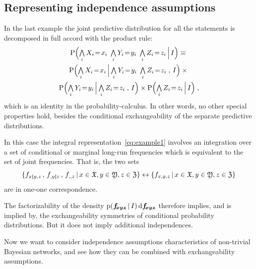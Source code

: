 \documentclass[\ifafour a4paper,12pt,\else a5paper,10pt,\fi%
onecolumn,oneside,article,%
british%
]{memoir}
\theoremstyle{remark}
\theoremstyle{innote}
\newcommand*{\di}{\mathrm{d}}%
\newcommand*{\Land}{\mathop{\textstyle\bigwedge}}
\DeclarePairedDelimiter\set{\{}{\}}
\newcommand*{\pf}{\mathrm{p}}%
\newcommand*{\p}{\mathrm{P}}%
\renewcommand*{\|}[1][]{\nonscript\,#1\vert\nonscript\,\mathopen{}}
\renewcommand*{\=}{\TextOrMath\texteq\eq}
\newcommand*{\X}[1]{X_{#1}}
\newcommand*{\x}[1]{x_{#1}}
\newcommand*{\A}[1]{A_{#1}}
\newcommand*{\B}[1]{B_{#1}}
\newcommand*{\Y}[1]{Y_{#1}}
\newcommand*{\y}[1]{y_{#1}}
\newcommand*{\Z}[1]{Z_{#1}}
\newcommand*{\z}[1]{z_{#1}}
\newcommand*{\sx}{\mathfrak{X}}
\newcommand*{\sy}{\mathfrak{Y}}
\newcommand*{\sz}{\mathfrak{Z}}
\newcommand*{\ff}[1]{f_{#1}}
\newcommand*{\ffb}[1]{\bm{f_{\!#1}}}
\newcommand*{\bcond}[1][]{\nonscript\,#1\bm{\vert}\nonscript\;\mathopen{}}
\begin{document}
\subsection{Representing independence assumptions}
\label{sec:graph_repr_indep}

In the last example the joint predictive distribution for all the
statements is decomposed in full accord with the product rule:
\begin{multline}
  \label{eq:example_usual_factorization}
  \p\Bigl( \Land_{i}\X{i}\=\x{i} \;  \Land_{i}\Y{i}\=\y{i} \;
  \Land_{i}\Z{i}\=\z{i} \|[\Big] I\Bigr)  \equiv{}\\
  \p\Bigl( \Land_{i}\X{i}\=\x{i} \|[\Big]  \Land_{i}\Y{i}\=\y{i} \;
  \Land_{i}\Z{i}\=\z{i}\;,\,  I\Bigr) \times{}\\
  \p\Bigl( \Land_{i}\Y{i}\=\y{i} \|[\Big]
  \Land_{i}\Z{i}\=\z{i}\;,\, I\Bigr) \times
  \p\Bigl( \Land_{i}\Z{i}\=\z{i} \|[\Big]  I\Bigr)
  \;,
\end{multline}
which is an identity in the probability-calculus. In other words, no other
special properties hold, besides the conditional exchangeability of the
separate predictive distributions.

In this case the integral representation~\eqref{eq:example1} involves an
integration over a set of conditional or marginal long-run frequencies
which is equivalent to the set of joint frequencies. That is, the two sets
\begin{equation}
  \label{eq:sets_corr}
  \set{\ff{x \bcond y,z} \,,\, \ff{,y \bcond z} \,,\, \ff{,,z} \|
 x \in \sx, y \in \sy, z \in \sz}
\leftrightarrow
\set{\ff{x,y,z} \| x \in \sx, y \in \sy, z \in \sz}
\end{equation}
are in one-one correspondence.

The factorizability of the density $\pf(\ffb{x y z}\|I)\,\di\ffb{x y z}$
therefore implies, and is implied by, the exchangeability symmetries of
conditional probability distributions. But it does not imply additional
independences.



Now we want to consider independence assumptions characteristics of
non-trivial Bayesian networks, and see how they can be combined with
exchangeability assumptions.
\end{document}
